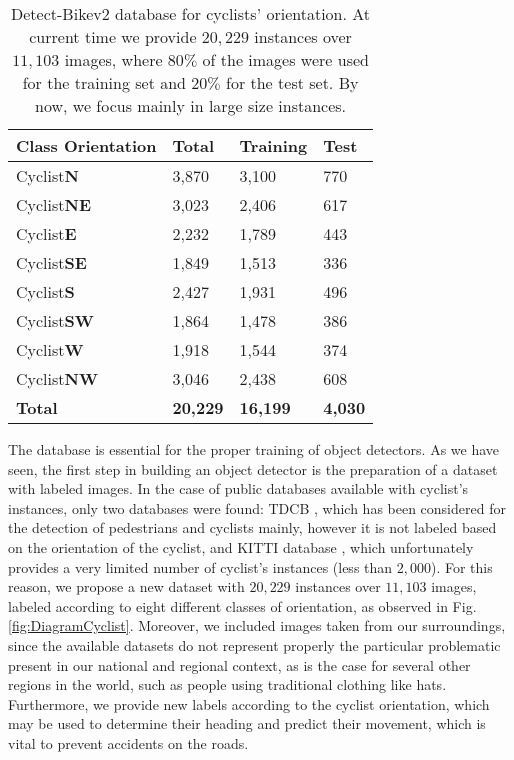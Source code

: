 \documentclass[journal]{IEEEtran}
\begin{document}
\begin{table}[hb!]
\begin{minipage}[c]{0.45\textwidth}
\caption{Detect-Bikev2 database for cyclists' orientation. At current time we provide $20,229$ instances over $11,103$ images, where $80\%$ of the images were used for the training set and $20\%$ for the test set. By now, we focus mainly in large size instances.
\label{table:CyclistDBOrientation}}
\end{minipage}
\addtolength{\tabcolsep}{-1pt}
\begin{center}
\begin{tabular}{llll}
\toprule
{Class Orientation}& {Total} & {Training} & {Test}  \\
\midrule
{Cyclist\textbf{N}} & 3,870 & 3,100 &   770 \\\hline
{Cyclist\textbf{NE}} & 3,023 & 2,406 &  617 \\\hline
{Cyclist\textbf{E}} & 2,232  &  1,789 &  443  \\\hline
{Cyclist\textbf{SE}} & 1,849  &   1,513 &  336  \\\hline
{Cyclist\textbf{S}} & 2,427  &  1,931 & 496    \\ \hline
{Cyclist\textbf{SW}} &  1,864 &  1,478 &   386  \\\hline
{Cyclist\textbf{W}} & 1,918  & 1,544 &   374 \\\hline
{Cyclist\textbf{NW} }& 3,046 & 2,438 &  608  \\\hline
{\textbf{Total}} &\textbf{20,229}  & \textbf{16,199} & \textbf{4,030} \\\hline
\bottomrule
\end{tabular}
\end{center}
\end{table}


The database is essential for the proper training of object detectors. As we have seen, the first step in building an object detector is the preparation of a dataset with labeled images. In the case of public databases available with cyclist's instances, only two databases were found: TDCB \cite{BenchmarkCylistDetect2016}, which has been considered for the detection of pedestrians and cyclists mainly, however it is not labeled based on the orientation of the cyclist, and KITTI database \cite{geiger2012we}, which unfortunately provides a very limited number of cyclist's instances (less than $2,000$). For this reason, we propose a new dataset with $20,229$ instances over $11,103$ images, labeled according to eight different classes of  orientation, as observed in Fig. \ref{fig:DiagramCyclist}. Moreover, we included images taken from our surroundings, since the available datasets do not represent properly the particular problematic present in our national and regional context, as is the case for several other regions in the world, such as people using traditional clothing like hats. Furthermore, we provide new labels according to the cyclist orientation, which may be used to determine their heading and predict their movement, which is vital to prevent accidents on the roads. 
\end{document}
